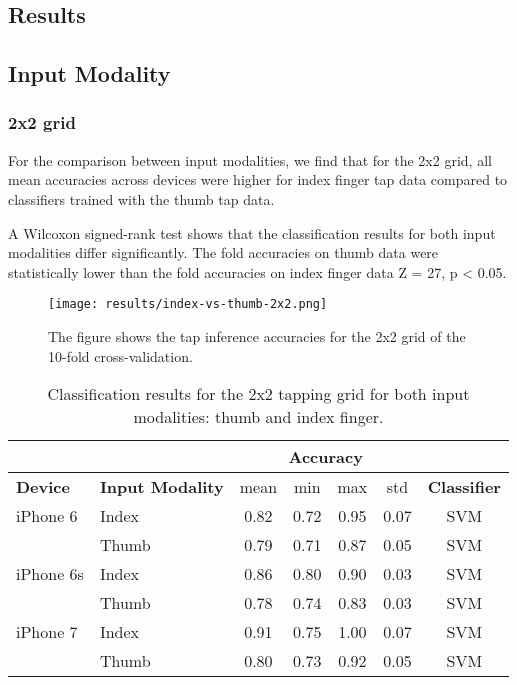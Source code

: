 
\begin{appendix}

\section*{Results}
\subsection*{Input Modality}
\subsubsection*{2x2 grid}
For the comparison between input modalities, we find that for the 2x2 grid, all mean accuracies across devices were higher for index finger tap data compared to classifiers trained with the thumb tap data.

A Wilcoxon signed-rank test shows that the classification results for both input modalities differ significantly. The fold accuracies on thumb data were statistically lower than the fold accuracies on index finger data Z = 27, p < 0.05.

\begin{figure}[h!]
  \centering
  \texttt{[image: results/index-vs-thumb-2x2.png]}
  \caption{The figure shows the tap inference accuracies for the 2x2 grid of the 10-fold cross-validation.} \label{fig:participation}
\end{figure}

\begin{table}[h!]
  \centering
\begin{tabular}{|l|l|c|c|c|c|c|}
  \cline{3-6}
  \multicolumn{2}{c}{} & \multicolumn{4}{|c|}{\textbf{Accuracy}}  \\
  \hline
  \textbf{Device} & \textbf{Input Modality} & mean &   min &   max  & std &  \textbf{Classifier} \\
  \hline
	iPhone 6 & Index &      0.82 &     0.72 &     0.95 &     0.07 &  SVM \\
	& Thumb &      0.79 &     0.71 &     0.87 &     0.05 &  SVM \\
	\hline
iPhone 6s & Index &      0.86 &     0.80 &     0.90 &     0.03 &  SVM \\
	& Thumb &      0.78 &     0.74 &     0.83 &     0.03 &  SVM \\
	\hline
	iPhone 7 & Index &      0.91 &     0.75 &     1.00 &     0.07 &  SVM \\
	& Thumb &      0.80 &     0.73 &     0.92 &     0.05 &  SVM \\
	\hline
\end{tabular}
  \caption{Classification results for the 2x2 tapping grid for both input modalities: thumb and index finger.}
\end{table}


\end{appendix}
